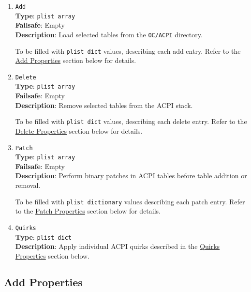 \documentclass[]{article}
\begin{document}
\begin{enumerate}

\item
  \texttt{Add}\\
  \textbf{Type}: \texttt{plist\ array}\\
  \textbf{Failsafe}: Empty\\
  \textbf{Description}: Load selected tables from the \texttt{OC/ACPI}
  directory.

  To be filled with \texttt{plist\ dict} values, describing each add entry.
  Refer to the \hyperref[acpipropsadd]{Add Properties} section below for details.

\item
  \texttt{Delete}\\
  \textbf{Type}: \texttt{plist\ array}\\
  \textbf{Failsafe}: Empty\\
  \textbf{Description}: Remove selected tables from the ACPI stack.

  To be filled with \texttt{plist\ dict} values, describing each delete entry.
  Refer to the \hyperref[acpipropsdelete]{Delete Properties} section below for details.

\item
  \texttt{Patch}\\
  \textbf{Type}: \texttt{plist\ array}\\
  \textbf{Failsafe}: Empty\\
  \textbf{Description}: Perform binary patches in ACPI tables before
  table addition or removal.

  To be filled with \texttt{plist\ dictionary} values describing each patch entry.
  Refer to the \hyperref[acpipropspatch]{Patch Properties} section below for details.

\item
  \texttt{Quirks}\\
  \textbf{Type}: \texttt{plist\ dict}\\
  \textbf{Description}: Apply individual ACPI quirks described
  in the \hyperref[acpipropsquirks]{Quirks Properties} section below.

\end{enumerate}

\subsection{Add Properties}\label{acpipropsadd}
\end{document}
